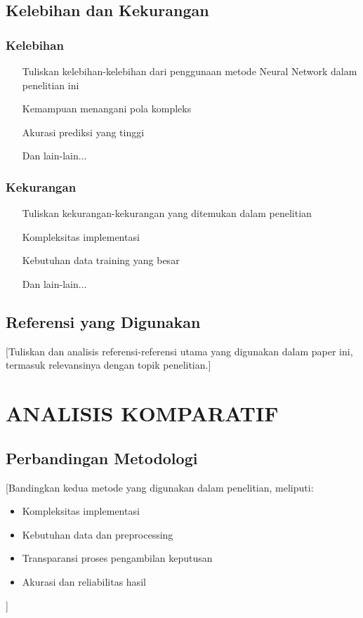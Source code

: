 \documentclass[10pt,a4paper]{article}
\begin{document}
\subsection{Kelebihan dan Kekurangan}

\subsubsection{Kelebihan}
\begin{itemize}
    \item [Tuliskan kelebihan-kelebihan dari penggunaan metode Neural Network dalam penelitian ini]
    \item [Kemampuan menangani pola kompleks]
    \item [Akurasi prediksi yang tinggi]
    \item [Dan lain-lain...]
\end{itemize}

\subsubsection{Kekurangan}
\begin{itemize}
    \item [Tuliskan kekurangan-kekurangan yang ditemukan dalam penelitian]
    \item [Kompleksitas implementasi]
    \item [Kebutuhan data training yang besar]
    \item [Dan lain-lain...]
\end{itemize}

\subsection{Referensi yang Digunakan}

[Tuliskan dan analisis referensi-referensi utama yang digunakan dalam paper ini, termasuk relevansinya dengan topik penelitian.]

\section{ANALISIS KOMPARATIF}

\subsection{Perbandingan Metodologi}

[Bandingkan kedua metode yang digunakan dalam penelitian, meliputi:
\begin{itemize}
    \item Kompleksitas implementasi
    \item Kebutuhan data dan preprocessing
    \item Transparansi proses pengambilan keputusan
    \item Akurasi dan reliabilitas hasil
\end{itemize}]
\end{document}
